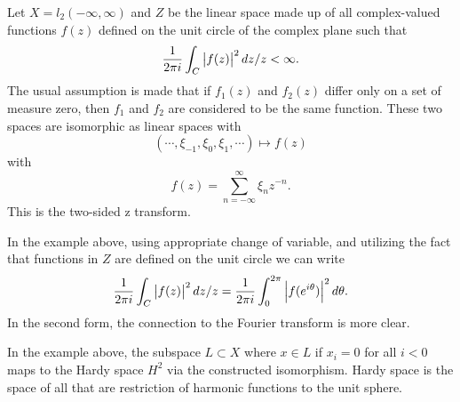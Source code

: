 \begin{summary}
	Let $ X = l_2(-\infty,\infty) $ and $ Z $ be the linear space made up of all complex-valued functions $ f(z) $ defined on the unit circle of the complex plane such that
	\[ \frac{1}{2\pi i} \int_C \left|f(z)\right|^2 dz/z <\infty. \]
	The usual assumption is made that if $ f_1(z) $ and $ f_2(z) $ differ only on a set of measure zero, then $ f_1 $ and $ f_2 $ are considered to be the same function. These two spaces are isomorphic as linear spaces with
	\[ (\cdots,\xi_{-1},\xi_0, \xi_1,\cdots) \mapsto f(z) \]
	with
	\[ f(z) = \sum_{n=-\infty}^{\infty}\xi_n z^{-n}. \]
	This is the two-sided z transform.
 \end{summary}
 \begin{remark}
 	In the example above, using appropriate change of variable, and utilizing the fact that functions in $ Z $ are defined on the unit circle we can write
 	\[ \frac{1}{2\pi i}\int_C \left|f(z)\right|^2 dz/z = \frac{1}{2\pi i}\int_{0}^{2\pi}\left|f(e^{i\theta})\right|^2 d\theta. \]
 	In the second form, the connection to the Fourier transform is more clear.
 \end{remark}
 \begin{remark}
 	In the example above, the subspace $ L \subset X$ where $ x\in L $ if $ x_i=0 $ for all $ i<0 $ maps to the Hardy space $ H^2 $ via the constructed isomorphism. Hardy space is the space of all that are restriction of harmonic functions to the unit sphere.
 \end{remark}
 
